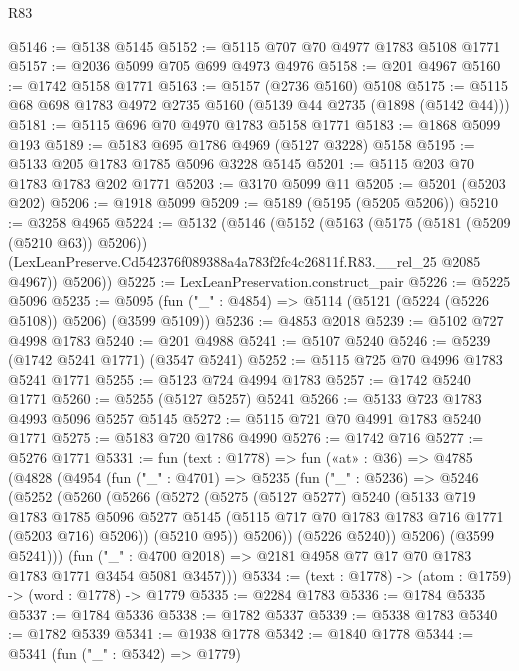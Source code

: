 \begin{lexlean}{R83}
\begin{coremodule}
@5146 := @5138 @5145
@5152 := @5115 @707 @70 @4977 @1783 @5108 @1771
@5157 := @2036 @5099 @705 @699 @4973 @4976
@5158 := @201 @4967
@5160 := @1742 @5158 @1771
@5163 := @5157 (@2736 @5160) @5108
@5175 := @5115 @68 @698 @1783 @4972 @2735 @5160 (@5139 @44 @2735 (@1898 (@5142 @44)))
@5181 := @5115 @696 @70 @4970 @1783 @5158 @1771
@5183 := @1868 @5099 @193
@5189 := @5183 @695 @1786 @4969 (@5127 @3228) @5158
@5195 := @5133 @205 @1783 @1785 @5096 @3228 @5145
@5201 := @5115 @203 @70 @1783 @1783 @202 @1771
@5203 := @3170 @5099 @11
@5205 := @5201 (@5203 @202)
@5206 := @1918 @5099
@5209 := @5189 (@5195 (@5205 @5206))
@5210 := @3258 @4965
@5224 := @5132
    (@5146
      (@5152
        (@5163
          (@5175 (@5181 (@5209 (@5210 @63)) @5206))
          (LexLeanPreserve.Cd542376f089388a4a783f2fc4c26811f.R83.__rel_25 @2085 @4967))
        @5206))
@5225 := LexLeanPreservation.construct_pair
@5226 := @5225 @5096
@5235 := @5095 (fun ("_" : @4854) => @5114 (@5121 (@5224 (@5226 @5108)) @5206) (@3599 @5109))
@5236 := @4853 @2018
@5239 := @5102 @727 @4998 @1783
@5240 := @201 @4988
@5241 := @5107 @5240
@5246 := @5239 (@1742 @5241 @1771) (@3547 @5241)
@5252 := @5115 @725 @70 @4996 @1783 @5241 @1771
@5255 := @5123 @724 @4994 @1783
@5257 := @1742 @5240 @1771
@5260 := @5255 (@5127 @5257) @5241
@5266 := @5133 @723 @1783 @4993 @5096 @5257 @5145
@5272 := @5115 @721 @70 @4991 @1783 @5240 @1771
@5275 := @5183 @720 @1786 @4990
@5276 := @1742 @716
@5277 := @5276 @1771
@5331 := fun (text : @1778) =>
  fun («at» : @36) =>
  @4785
    (@4828
      (@4954
        (fun ("_" : @4701) =>
        @5235
          (fun ("_" : @5236) =>
          @5246
            (@5252
              (@5260
                (@5266
                  (@5272
                    (@5275
                      (@5127 @5277)
                      @5240
                      (@5133
                        @719
                        @1783
                        @1785
                        @5096
                        @5277
                        @5145
                        (@5115 @717 @70 @1783 @1783 @716 @1771 (@5203 @716) @5206))
                      (@5210 @95))
                    @5206))
                (@5226 @5240))
              @5206)
            (@3599 @5241)))
        (fun ("_" : @4700 @2018) => @2181 @4958 @77 @17 @70 @1783 @1783 @1771 @3454 @5081 @3457)))
@5334 := (text : @1778) -> (atom : @1759) -> (word : @1778) -> @1779
@5335 := @2284 @1783
@5336 := @1784 @5335
@5337 := @1784 @5336
@5338 := @1782 @5337
@5339 := @5338 @1783
@5340 := @1782 @5339
@5341 := @1938 @1778
@5342 := @1840 @1778
@5344 := @5341 (fun ("_" : @5342) => @1779)

\end{coremodule}
\end{lexlean}
